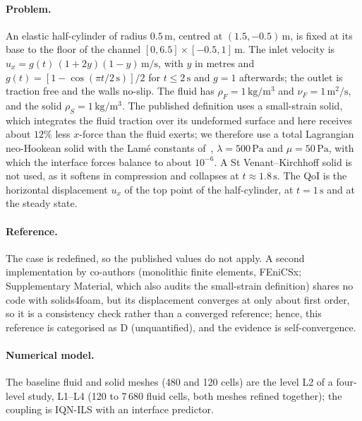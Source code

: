 \paragraph{Problem.}
An elastic half-cylinder of radius $0.5\,\mathrm{m}$, centred at $(1.5, -0.5)\,\mathrm{m}$, is fixed at its base to the floor of the channel $[0, 6.5]\times[-0.5, 1]\,\mathrm{m}$.
The inlet velocity is $u_x = g(t)\,(1 + 2y)(1 - y)\,\mathrm{m/s}$, with $y$ in metres and $g(t) = [1 - \cos(\pi t/2\,\mathrm{s})]/2$ for $t \le 2\,\mathrm{s}$ and $g = 1$ afterwards; the outlet is traction free and the walls no-slip.
The fluid has $\rho_F = 1\,\mathrm{kg/m^3}$ and $\nu_F = 1\,\mathrm{m^2/s}$, and the solid $\rho_S = 1\,\mathrm{kg/m^3}$.
The published definition uses a small-strain solid, which integrates the fluid traction over its undeformed surface and here receives about $12\%$ less $x$-force than the fluid exerts; we therefore use a total Lagrangian neo-Hookean solid with the Lam\'e constants of~\citet{Liu2014}, $\lambda = 500\,\mathrm{Pa}$ and $\mu = 50\,\mathrm{Pa}$, with which the interface forces balance to about $10^{-6}$. A St Venant--Kirchhoff solid is not used, as it softens in compression and collapses at $t \approx 1.8\,\mathrm{s}$.
The QoI is the horizontal displacement $u_x$ of the top point of the half-cylinder, at $t = 1\,\mathrm{s}$ and at the steady state.

\paragraph{Reference.}
The case is redefined, so the published values do not apply.
A second implementation by co-authors (monolithic finite elements, FEniCSx; Supplementary Material, which also audits the small-strain definition) shares no code with solids4foam, but its displacement converges at only about first order, so it is a consistency check rather than a converged reference; hence, this reference is categorised as D (unquantified), and the evidence is self-convergence.

\paragraph{Numerical model.}
The baseline fluid and solid meshes (480 and 120 cells) are the level L2 of a four-level study, L1--L4 (120 to 7\,680 fluid cells, both meshes refined together); the coupling is IQN-ILS with an interface predictor.

